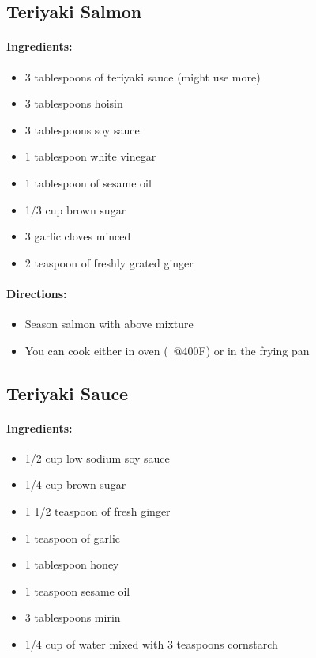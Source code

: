 \documentclass{article}
\begin{document}
\subsection{Teriyaki Salmon}{}

\paragraph{Ingredients:}
\begin{itemize}
	\item 3 tablespoons of teriyaki sauce (might use more)
	\item 3 tablespoons hoisin
	\item 3 tablespoons soy sauce
	\item 1 tablespoon white vinegar
	\item 1 tablespoon of sesame oil
	\item 1/3 cup brown sugar
	\item 3 garlic cloves minced
	\item 2 teaspoon of freshly grated ginger
\end{itemize}

\paragraph{Directions:}
\begin{itemize}
	\item Season salmon with above mixture
	\item You can cook either in oven (~@400F) or in the frying pan
\end{itemize}

\subsection{Teriyaki Sauce}

\paragraph{Ingredients:}

\begin{itemize}
	\item 1/2 cup low sodium soy sauce
	\item 1/4 cup brown sugar
	\item 1 1/2 teaspoon of fresh ginger
	\item 1 teaspoon of garlic
	\item 1 tablespoon honey
	\item 1 teaspoon sesame oil
	\item 3 tablespoons mirin
	\item 1/4 cup of water mixed with 3 teaspoons cornstarch
\end{itemize}
\end{document}

